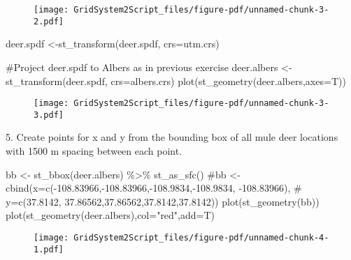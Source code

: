 \documentclass[
  letterpaper,
]{book}
\newenvironment{Shaded}{\begin{snugshade}}{\end{snugshade}}
\newcommand{\AttributeTok}[1]{\textcolor[rgb]{0.40,0.45,0.13}{#1}}
\newcommand{\CommentTok}[1]{\textcolor[rgb]{0.37,0.37,0.37}{#1}}
\newcommand{\FunctionTok}[1]{\textcolor[rgb]{0.28,0.35,0.67}{#1}}
\newcommand{\NormalTok}[1]{\textcolor[rgb]{0.00,0.23,0.31}{#1}}
\newcommand{\OtherTok}[1]{\textcolor[rgb]{0.00,0.23,0.31}{#1}}
\newcommand{\SpecialCharTok}[1]{\textcolor[rgb]{0.37,0.37,0.37}{#1}}
\newcommand{\StringTok}[1]{\textcolor[rgb]{0.13,0.47,0.30}{#1}}
\begin{document}
\begin{figure}[H]

{\centering \texttt{[image: GridSystem2Script\_files/figure-pdf/unnamed-chunk-3-2.pdf]}

}

\end{figure}

\begin{Shaded}
\begin{Highlighting}[]
\NormalTok{deer.spdf }\OtherTok{\textless{}{-}}\FunctionTok{st\_transform}\NormalTok{(deer.spdf, }\AttributeTok{crs=}\NormalTok{utm.crs)}

\CommentTok{\#Project deer.spdf to Albers as in previous exercise}
\NormalTok{deer.albers }\OtherTok{\textless{}{-}}\FunctionTok{st\_transform}\NormalTok{(deer.spdf, }\AttributeTok{crs=}\NormalTok{albers.crs)}
\FunctionTok{plot}\NormalTok{(}\FunctionTok{st\_geometry}\NormalTok{(deer.albers,}\AttributeTok{axes=}\NormalTok{T))}
\end{Highlighting}
\end{Shaded}

\begin{figure}[H]

{\centering \texttt{[image: GridSystem2Script\_files/figure-pdf/unnamed-chunk-3-3.pdf]}

}

\end{figure}

5. Create points for x and y from the bounding box of all mule deer
locations with 1500 m spacing between each point.

\begin{Shaded}
\begin{Highlighting}[]
\NormalTok{bb }\OtherTok{\textless{}{-}} \FunctionTok{st\_bbox}\NormalTok{(deer.albers) }\SpecialCharTok{\%\textgreater{}\%} \FunctionTok{st\_as\_sfc}\NormalTok{()}
\CommentTok{\#bb \textless{}{-} cbind(x=c({-}108.83966,{-}108.83966,{-}108.9834,{-}108.9834, {-}108.83966), }
\CommentTok{\#  y=c(37.8142, 37.86562,37.86562,37.8142,37.8142))}
\FunctionTok{plot}\NormalTok{(}\FunctionTok{st\_geometry}\NormalTok{(bb))}
\FunctionTok{plot}\NormalTok{(}\FunctionTok{st\_geometry}\NormalTok{(deer.albers),}\AttributeTok{col=}\StringTok{"red"}\NormalTok{,}\AttributeTok{add=}\NormalTok{T)}
\end{Highlighting}
\end{Shaded}

\begin{figure}[H]

{\centering \texttt{[image: GridSystem2Script\_files/figure-pdf/unnamed-chunk-4-1.pdf]}

}

\end{figure}
\end{document}
